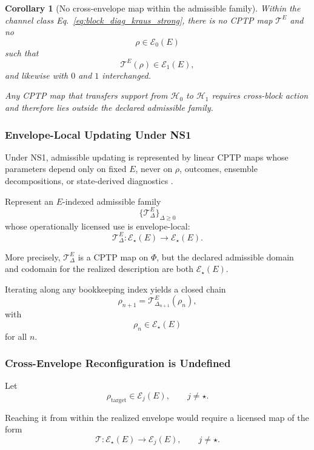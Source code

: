 \documentclass[aps,prx,onecolumn,11pt]{revtex4-2}
\theoremstyle{plain}
\newtheorem{corollary}{Corollary}
\theoremstyle{definition}
\theoremstyle{remark}
\begin{document}
\begin{corollary}[No cross-envelope map within the admissible family]
\label{cor:no_cross_env_in_family}
Within the channel class Eq.~\eqref{eq:block_diag_kraus_strong}, there
is no CPTP map \(\mathcal T^E\) and no
\[
\rho\in\mathcal E_0(E)
\]
such that
\[
\mathcal T^E(\rho)\in\mathcal E_1(E),
\]
and likewise with \(0\) and \(1\) interchanged.

Any CPTP map that transfers support from \(\mathcal H_0\) to
\(\mathcal H_1\) requires cross-block action and therefore lies outside
the declared admissible family.
\end{corollary}

\subsubsection{Envelope-Local Updating Under NS1}
\label{subsubsec:resolution_sequencing_env_local_strong}

Under NS1, admissible updating is represented by linear CPTP maps whose
parameters depend only on fixed \(E\), never on \(\rho\), outcomes,
ensemble decompositions, or state-derived diagnostics
\cite{Kraus1983,Lindblad1976,Gorini1976,Watrous2018,Wilde2017}.

Represent an \(E\)-indexed admissible family
\[
\{\mathcal T^E_\Delta\}_{\Delta\geq 0}
\]
whose operationally licensed use is envelope-local:
\begin{equation}
\mathcal T^E_\Delta:
\mathcal E_\star(E)
\longrightarrow
\mathcal E_\star(E).
\label{eq:env_local_family_strong}
\end{equation}

More precisely, \(\mathcal T^E_\Delta\) is a CPTP map on \(\Phi\), but
the declared admissible domain and codomain for the realized
description are both \(\mathcal E_\star(E)\).

Iterating along any bookkeeping index yields a closed chain
\[
\rho_{n+1}
=
\mathcal T^E_{\Delta_{n+1}}(\rho_n),
\]
with
\[
\rho_n\in\mathcal E_\star(E)
\]
for all \(n\).

\subsubsection{Cross-Envelope Reconfiguration is Undefined}
\label{subsubsec:cross_env_undefined_stronger}

Let
\[
\rho_{\mathrm{target}}\in\mathcal E_j(E),
\qquad
j\neq\star.
\]

Reaching it from within the realized envelope would require a licensed
map of the form
\begin{equation}
\mathcal T:
\mathcal E_\star(E)
\longrightarrow
\mathcal E_j(E),
\qquad
j\neq\star.
\label{eq:cross_env_map_strong}
\end{equation}
\end{document}
